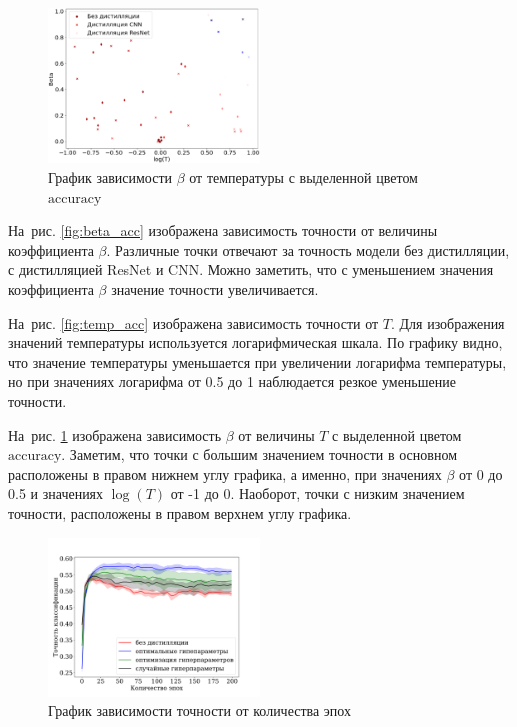 \documentclass[12pt, twoside]{article}
\begin{document}
\begin{figure}[!ht]
    \centering
    \includegraphics[width=0.5\textwidth]{scatter_temp_beta.eps}
    \caption{График зависимости $\beta$ от температуры с выделенной цветом $\text{accuracy}$}
    \label{fig:temp_beta}
\end{figure}

На~рис. \ref{fig:beta_acc} изображена зависимость точности от величины коэффициента $\beta$. Различные точки отвечают за точность модели без дистилляции, с дистилляцией ResNet и CNN. Можно заметить, что с уменьшением значения коэффициента $\beta$ значение точности увеличивается.

На~рис. \ref{fig:temp_acc} изображена зависимость точности от $T$. Для изображения значений температуры используется логарифмическая шкала. По графику видно, что значение температуры уменьшается при увеличении логарифма температуры, но при значениях логарифма от 0.5 до 1 наблюдается резкое уменьшение точности.

На~рис. \ref{fig:temp_beta} изображена зависимость $\beta$ от величины $T$ с выделенной цветом $\text{accuracy}$. Заметим, что точки с большим значением точности в основном расположены в правом нижнем углу графика, а именно, при значениях $\beta$ от 0 до 0.5 и значениях $\log(T)$ от -1 до 0. Наоборот, точки с низким значением точности, расположены в правом верхнем углу графика.

\begin{figure}[!ht]
    \centering
    \includegraphics[width=0.5\textwidth]{slides/acc.pdf}
    \caption{График зависимости точности от количества эпох}
    \label{fig:acc_epoch}
\end{figure}
\end{document}
